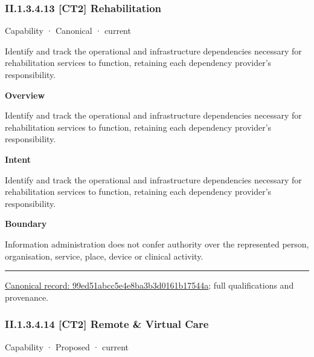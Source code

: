 \subsubsection*{II.1.3.4.13 [CT2] Rehabilitation}
\label{navigation:II.1.3.4.13}

\label{element:99ed51abcc5e4e8ba3b3d0161b17544a}
{\small Capability · Canonical · current}\par

Identify and track the operational and infrastructure dependencies necessary for rehabilitation services to function, retaining each dependency provider's responsibility.



\textbf{Overview}



Identify and track the operational and infrastructure dependencies necessary for rehabilitation services to function, retaining each dependency provider's responsibility.



\textbf{Intent}



Identify and track the operational and infrastructure dependencies necessary for rehabilitation services to function, retaining each dependency provider's responsibility.



\textbf{Boundary}



Information administration does not confer authority over the represented person, organisation, service, place, device or clinical activity.



\medskip\hrule\medskip

{\footnotesize \href{../../../../continuum/strategy/capability/99ed51abcc5e4e8ba3b3d0161b17544a.md}{Canonical record: 99ed51abcc5e4e8ba3b3d0161b17544a}; full qualifications and provenance.}\par
\subsubsection*{II.1.3.4.14 [CT2] Remote \& Virtual Care}
\label{navigation:II.1.3.4.14}

\label{element:30dff22d40b64da29ede7c41673db085}
{\small Capability · Proposed · current}\par

